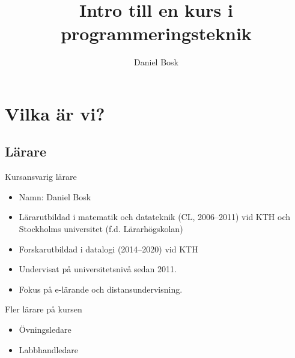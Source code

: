 \title{%
  Intro till en kurs i programmeringsteknik
}
\author{Daniel Bosk}


\mode*

\begin{abstract}
  
\end{abstract}


\section{Vilka är vi?}

\subsection{Lärare}

\begin{frame}
  \begin{block}{Kursansvarig lärare}
    \begin{itemize}
      \item Namn: Daniel Bosk
      \item Lärarutbildad i matematik och datateknik (CL, 2006--2011) vid KTH 
        och Stockholms universitet (f.d. Lärarhögskolan)
      \item Forskarutbildad i datalogi (2014--2020) vid KTH
      \item Undervisat på universitetsnivå sedan 2011.
      \item Fokus på e-lärande och distansundervisning.
    \end{itemize}
  \end{block}
\end{frame}

\begin{frame}
  \begin{block}{Fler lärare på kursen}
    \begin{itemize}
      \item Övningsledare
      \item Labbhandledare
    \end{itemize}
  \end{block}
\end{frame}


